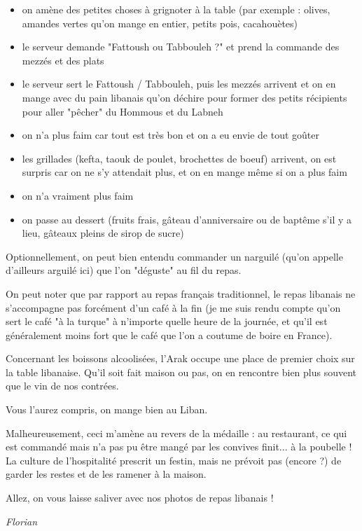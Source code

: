 \begin{itemize}
\tightlist
\item
  on amène des petites choses à grignoter à la table (par exemple :
  olives, amandes vertes qu'on mange en entier, petits pois,
  cacahouètes)
\item
  le serveur demande "Fattoush ou Tabbouleh ?" et prend la commande des
  mezzés et des plats
\item
  le serveur sert le Fattoush / Tabbouleh, puis les mezzés arrivent et
  on en mange avec du pain libanais qu'on déchire pour former des petits
  récipients pour aller "pêcher" du Hommous et du Labneh
\item
  on n'a plus faim car tout est très bon et on a eu envie de tout goûter
\item
  les grillades (kefta, taouk de poulet, brochettes de boeuf) arrivent,
  on est surpris car on ne s'y attendait plus, et on en mange même si on
  a plus faim
\item
  on n'a vraiment plus faim
\item
  on passe au dessert (fruits frais, gâteau d'anniversaire ou de baptême
  s'il y a lieu, gâteaux pleins de sirop de sucre)
\end{itemize}

Optionnellement, on peut bien entendu commander un narguilé (qu'on
appelle d'ailleurs arguilé ici) que l'on "déguste" au fil du repas.

On peut noter que par rapport au repas français traditionnel, le repas
libanais ne s'accompagne pas forcément d'un café à la fin (je me suis
rendu compte qu'on sert le café "à la turque" à n'importe quelle heure
de la journée, et qu'il est généralement moins fort que le café que l'on
a coutume de boire en France).

Concernant les boissons alcoolisées, l'Arak occupe une place de premier
choix sur la table libanaise. Qu'il soit fait maison ou pas, on en
rencontre bien plus souvent que le vin de nos contrées.

Vous l'aurez compris, on mange bien au Liban.

Malheureusement, ceci m'amène au revers de la médaille : au restaurant,
ce qui est commandé mais n'a pas pu être mangé par les convives finit...
à la poubelle ! La culture de l'hospitalité prescrit un festin, mais ne
prévoit pas (encore ?) de garder les restes et de les ramener à la
maison.

Allez, on vous laisse saliver avec nos photos de repas libanais !

\emph{Florian}
